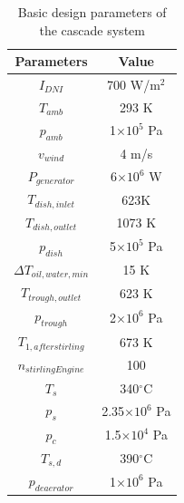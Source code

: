 \documentclass{article}
\begin{document}
\begin{table}[htbp]
	\caption{Basic design parameters of the cascade system}
	\begin{center}
	\begin{tabular}{cc}
		\toprule
		Parameters			&	Value\\
		\midrule
		$I_{DNI}$			&	700 W/m$^2$\\
		$T_{amb}$			&	293 K\\
		$p_{amb}$			&	1$\times10^5$ Pa\\
		$v_{wind}$			&	4 m/s\\
		$P_{generator}$		&	6$\times10^6$ W\\
		$T_{dish,inlet}$	&	623K\\
		$T_{dish,outlet}$	&	1073 K\\
		$p_{dish}$			&	5$\times10^5$ Pa\\
		$\Delta{}T_{oil,water,min}$	&	15 K \\
		$T_{trough,outlet}$	&	623 K\\
		$p_{trough}$		&	2$\times10^6$ Pa\\
		$T_{1,afterstirling}$	&	673 K\\
		$n_{stirlingEngine}$	&	100\\
		$T_s$				&	340$^\circ$C\\
		$p_s$				&	2.35$\times10^6$ Pa\\
		$p_c$				&	1.5$\times10^4$ Pa\\
		$T_{s,d}$			&	390$^\circ$C\\
		$p_{deaerator}$ & 1$\times10^6$ Pa\\
		\bottomrule
	\end{tabular}
	\end{center}
	\label{tab:system-data}
\end{table}
\end{document}
